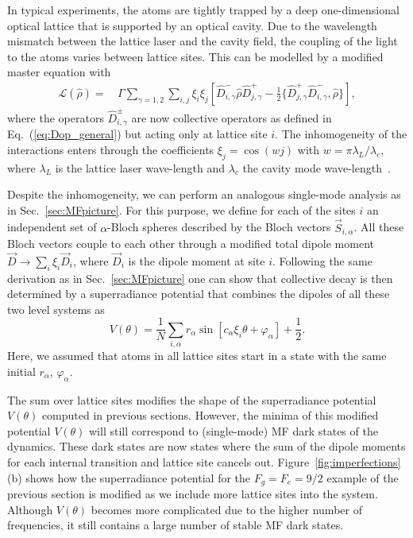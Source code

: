 \documentclass[aps,prx,superscriptaddress,twocolumn,notitlepage,nofootinbib,longbibliography]{revtex4-2}
\begin{document}
In typical experiments, the atoms are tightly trapped by a deep one-dimensional
optical lattice that is supported by an optical cavity.  Due to the wavelength mismatch between the lattice laser and the cavity field,  the coupling of the light to the atoms  varies between lattice sites. This can be modelled by a modified master equation with
\begin{align}
	\mathcal{L}(\hat\rho) =&\, \Gamma \sum_{\gamma=1,2} \sum_{i,j} \xi_i \xi_j \left[ \hat{D}^-_{i,\gamma} \hat\rho \hat{D}^+_{j,\gamma} - \frac{1}{2} \{ \hat{D}^+_{j,\gamma} \hat{D}^-_{i,\gamma}, \hat\rho \} \right],
\label{eq:L_2pol_inhom}
\end{align}
where the operators $\hat{D}^\pm_{i,\gamma}$ are now collective operators as defined in Eq.~(\ref{eq:Dop_general}) but acting only at lattice site  $i$. The inhomogeneity of the interactions enters through the coefficients $\xi_j = \cos(w j)$ with $w=\pi \lambda_L/\lambda_c$, where $\lambda_L$ is the lattice laser wave-length and $\lambda_c$ the cavity mode wave-length~\cite{ThompsonMuniz_Arxiv2019}.

Despite the inhomogeneity, we can perform an analogous single-mode analysis as in Sec.~\ref{sec:MFpicture}. For this purpose, we define for each of the sites  $i$ an independent set of $\alpha$-Bloch spheres described by the Bloch vectors $\vec{S}_{i,\alpha}$.
All these Bloch vectors couple to each other through a modified total dipole moment $\vec{D}\rightarrow \sum_i \xi_i \vec{D}_i$, where $\vec{D}_i$ is the dipole moment at site  $i$.
Following the same derivation as in Sec.~\ref{sec:MFpicture} one can show that  collective decay is then determined by a superradiance potential that combines the dipoles of all these two level systems as
\begin{equation}
	V(\theta) = \frac{1}{N} \sum_{i,\alpha} r_\alpha \sin\left[ c_\alpha \xi_i \theta + \varphi_\alpha \right] + \frac{1}{2}.
\label{eq:V_general_inhomog}
\end{equation}
Here, we assumed that atoms in  all lattice sites  start in a state with the same initial $r_\alpha$, $\varphi_\alpha$.

The sum over lattice sites  modifies the shape of the superradiance potential $V(\theta)$ computed in previous sections. However, the minima of this modified potential  $V(\theta)$ will still correspond to (single-mode) MF dark states of the dynamics. These dark states are now states where the sum of the dipole moments for each internal transition and lattice site  cancels out.
Figure~\ref{fig:imperfections}(b) shows how the superradiance potential for the $F_g=F_e=9/2$ example of the previous section is modified as we include more lattice sites  into the system. Although $V(\theta)$ becomes more complicated due to the higher number of frequencies, it still contains a large number of stable MF dark states.
\end{document}
